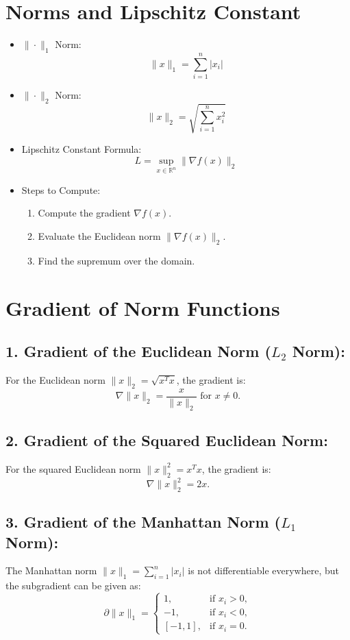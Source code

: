 \documentclass{article}
\begin{document}
\section*{Norms and Lipschitz Constant}

\begin{itemize}[left=0pt]
    \item $\| \cdot \|_1$ Norm:
    \[
    \|x\|_1 = \sum_{i=1}^{n} |x_i|
    \]

    \item $\| \cdot \|_2$ Norm:
    \[
    \|x\|_2 = \sqrt{\sum_{i=1}^{n} x_i^2}
    \]

    \item Lipschitz Constant Formula:
    \[
    L = \sup_{x \in \mathbb{R}^n} \|\nabla f(x)\|_2
    \]

    \item Steps to Compute:
    \begin{enumerate}
        \item Compute the gradient $\nabla f(x)$.
        \item Evaluate the Euclidean norm $\|\nabla f(x)\|_2$.
        \item Find the supremum over the domain.
    \end{enumerate}
\end{itemize}




\section*{Gradient of Norm Functions}

\subsection*{1. Gradient of the Euclidean Norm ($L_2$ Norm):}
For the Euclidean norm $\|x\|_2 = \sqrt{x^T x}$, the gradient is:
\[
\nabla \|x\|_2 = \frac{x}{\|x\|_2} \text{ for } x \neq 0.
\]

\subsection*{2. Gradient of the Squared Euclidean Norm:}
For the squared Euclidean norm $\|x\|^2_2 = x^T x$, the gradient is:
\[
\nabla \|x\|^2_2 = 2x.
\]

\subsection*{3. Gradient of the Manhattan Norm ($L_1$ Norm):}
The Manhattan norm $\|x\|_1 = \sum_{i=1}^{n} |x_i|$ is not differentiable everywhere, but the subgradient can be given as:
\[
\partial \|x\|_1 =
\begin{cases}
1, & \text{if } x_i > 0, \\
-1, & \text{if } x_i < 0, \\
[-1, 1], & \text{if } x_i = 0.
\end{cases}
\]
\end{document}
